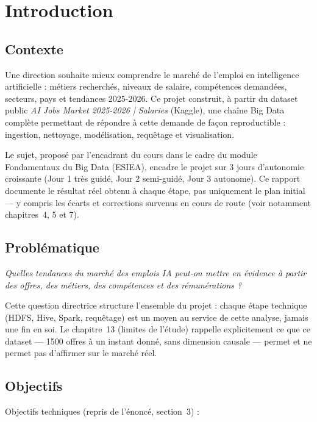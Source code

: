 \chapter{Introduction}

\section{Contexte}

Une direction souhaite mieux comprendre le marché de l'emploi en
intelligence artificielle : métiers recherchés, niveaux de salaire,
compétences demandées, secteurs, pays et tendances 2025-2026. Ce
projet construit, à partir du dataset public \emph{AI Jobs Market
2025-2026 | Salaries} (Kaggle), une chaîne Big Data complète permettant
de répondre à cette demande de façon reproductible : ingestion,
nettoyage, modélisation, requêtage et visualisation.

Le sujet, proposé par l'encadrant du cours dans le cadre du module
Fondamentaux du Big Data (ESIEA), encadre le projet sur 3 jours
d'autonomie croissante (Jour 1 très guidé, Jour 2 semi-guidé, Jour 3
autonome). Ce rapport documente le résultat réel obtenu à chaque étape,
pas uniquement le plan initial — y compris les écarts et corrections
survenus en cours de route (voir notamment chapitres~4, 5 et 7).

\section{Problématique}

\begin{center}
\emph{Quelles tendances du marché des emplois IA peut-on mettre en
évidence à partir des offres, des métiers, des compétences et des
rémunérations ?}
\end{center}

Cette question directrice structure l'ensemble du projet : chaque
étape technique (HDFS, Hive, Spark, requêtage) est un moyen au service
de cette analyse, jamais une fin en soi. Le chapitre~13 (limites de
l'étude) rappelle explicitement ce que ce dataset — 1500 offres à un
instant donné, sans dimension causale — permet et ne permet pas
d'affirmer sur le marché réel.

\section{Objectifs}

Objectifs techniques (repris de l'énoncé, section~3) :

